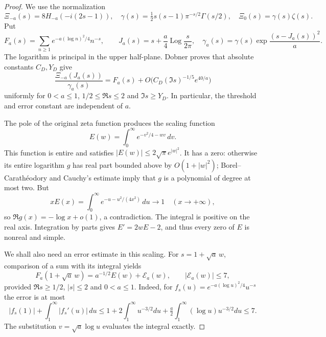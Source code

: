 \begin{proof}
We use the normalization
\[
 \Xi_{-a}(s)=8H_{-a}(-i(2s-1)),\quad
 \gamma(s)=\tfrac12s(s-1)\pi^{-s/2}\Gamma(s/2),
 \quad \Xi_0(s)=\gamma(s)\zeta(s).
\]
Put
\[
 F_a(s)=\sum_{n\ge1}e^{-a(\log n)^2/4}n^{-s},\qquad
 J_a(s)=s+\frac a4\operatorname{Log}\frac{s}{2\pi},
 \quad
 \gamma_a(s)=\gamma(s)\exp\frac{(s-J_a(s))^2}{a}.
\]
The logarithm is principal in the upper half-plane. Dobner
\cite[Theorem~4, equations~(10)--(13)]{dobner} proves that absolute
constants $C_D,Y_D$ give
\begin{equation}\label{eq:dobner-height}
 \frac{\Xi_{-a}(J_a(s))}{\gamma_a(s)}
 =F_a(s)+O\bigl(C_D(\Im s)^{-1/5}e^{40/a}\bigr)
\end{equation}
uniformly for $0<a\le1$, $1/2\le\Re s\le2$ and $\Im s\ge Y_D$.
In particular, the threshold and error constant are independent of $a$.

The pole of the original zeta function produces the scaling function
\[
 E(w)=\int_0^\infty e^{-v^2/4-wv}\,dv.
\]
This function is entire and satisfies $|E(w)|\le2\sqrt\pi e^{|w|^2}$.
It has a zero: otherwise its entire logarithm $g$ has real part bounded
above by $O(1+|w|^2)$; Borel--Carath\'eodory and Cauchy's estimate imply
that $g$ is a polynomial of degree at most two. But
\[
 xE(x)=\int_0^\infty e^{-u-u^2/(4x^2)}\,du\longrightarrow1
 \quad(x\longrightarrow+\infty),
\]
so $\Re g(x)=-\log x+o(1)$, a contradiction. The integral is positive
on the real axis. Integration by parts gives $E'=2wE-2$, and thus every
zero of $E$ is nonreal and simple.

We shall also need an error estimate in this scaling. For
$s=1+\sqrt a\,w$, comparison of a sum with its integral yields
\begin{equation}\label{eq:heat-pole-profile}
 F_a(1+\sqrt a\,w)=a^{-1/2}E(w)+\mathcal E_a(w),
 \qquad |\mathcal E_a(w)|\le7,
\end{equation}
provided $\Re s\ge1/2$, $|s|\le2$ and $0<a\le1$. Indeed, for
$f_s(u)=e^{-a(\log u)^2/4}u^{-s}$ the error is at most
\[
 |f_s(1)|+\int_1^\infty|f_s'(u)|\,du
 \le 1+2\int_1^\infty u^{-3/2}du
       +\tfrac a2\int_1^\infty(\log u)u^{-3/2}du\le7.
\]
The substitution $v=\sqrt a\log u$ evaluates the integral exactly.


\end{proof}
